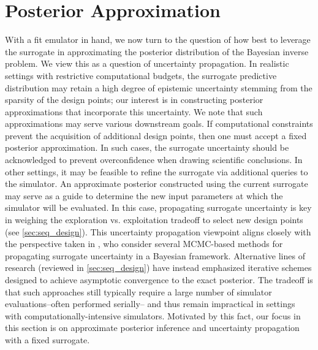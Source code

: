 \documentclass[12pt]{article}
\begin{document}
\section{Posterior Approximation}
With a fit emulator in hand, we now turn to the question of how best to leverage the surrogate in approximating the 
posterior distribution of the Bayesian inverse problem. We view this as a question of uncertainty propagation. 
In realistic settings with restrictive computational budgets, the surrogate predictive distribution may retain a high degree of 
epistemic uncertainty stemming from the sparsity of the design points; our interest is in constructing posterior 
approximations that incorporate this uncertainty. We note that such approximations 
may serve various downstream goals. If computational constraints prevent the acquisition of additional 
design points, then one must accept a fixed posterior approximation.
In such cases, the surrogate uncertainty should be acknowledged to prevent 
overconfidence when drawing scientific conclusions. In other settings, it may be feasible to refine the surrogate 
via additional queries to the simulator. An approximate posterior constructed using the current 
surrogate may serve as a guide to determine the new input parameters at which the simulator will be 
evaluated. In this case, propagating surrogate uncertainty is key in weighing the exploration vs. exploitation 
tradeoff to select new design points (see \cref{sec:seq_design}).
This uncertainty propagation viewpoint aligns closely with the perspective taken in \citep{BurknerSurrogate}, 
who consider several MCMC-based methods for propagating surrogate uncertainty in a Bayesian framework. 
Alternative lines of research (reviewed in \cref{sec:seq_design}) have instead emphasized iterative schemes 
designed to achieve asymptotic convergence to the exact posterior. The tradeoff is that such approaches 
still typically require a large number of simulator evaluations--often performed serially-- and thus remain 
impractical in settings with computationally-intensive simulators.
Motivated by this fact, our focus in this section is on approximate posterior inference and uncertainty propagation
with a fixed surrogate.
\end{document}
